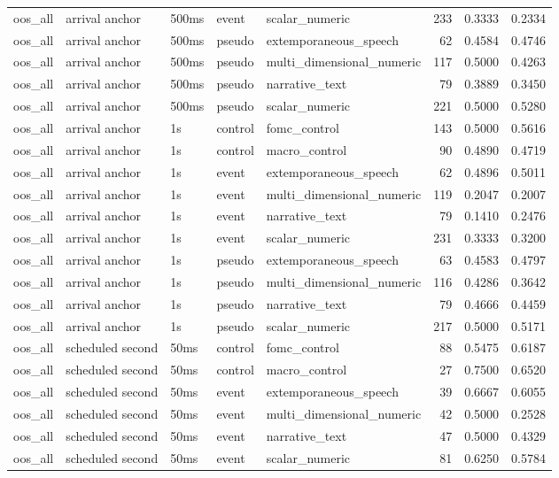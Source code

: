 \begin{tabular}{lllllrrr}
oos_all & arrival anchor & 500ms & event & scalar_numeric & 233 & 0.3333 & 0.2334 \\
oos_all & arrival anchor & 500ms & pseudo & extemporaneous_speech & 62 & 0.4584 & 0.4746 \\
oos_all & arrival anchor & 500ms & pseudo & multi_dimensional_numeric & 117 & 0.5000 & 0.4263 \\
oos_all & arrival anchor & 500ms & pseudo & narrative_text & 79 & 0.3889 & 0.3450 \\
oos_all & arrival anchor & 500ms & pseudo & scalar_numeric & 221 & 0.5000 & 0.5280 \\
oos_all & arrival anchor & 1s & control & fomc_control & 143 & 0.5000 & 0.5616 \\
oos_all & arrival anchor & 1s & control & macro_control & 90 & 0.4890 & 0.4719 \\
oos_all & arrival anchor & 1s & event & extemporaneous_speech & 62 & 0.4896 & 0.5011 \\
oos_all & arrival anchor & 1s & event & multi_dimensional_numeric & 119 & 0.2047 & 0.2007 \\
oos_all & arrival anchor & 1s & event & narrative_text & 79 & 0.1410 & 0.2476 \\
oos_all & arrival anchor & 1s & event & scalar_numeric & 231 & 0.3333 & 0.3200 \\
oos_all & arrival anchor & 1s & pseudo & extemporaneous_speech & 63 & 0.4583 & 0.4797 \\
oos_all & arrival anchor & 1s & pseudo & multi_dimensional_numeric & 116 & 0.4286 & 0.3642 \\
oos_all & arrival anchor & 1s & pseudo & narrative_text & 79 & 0.4666 & 0.4459 \\
oos_all & arrival anchor & 1s & pseudo & scalar_numeric & 217 & 0.5000 & 0.5171 \\
oos_all & scheduled second & 50ms & control & fomc_control & 88 & 0.5475 & 0.6187 \\
oos_all & scheduled second & 50ms & control & macro_control & 27 & 0.7500 & 0.6520 \\
oos_all & scheduled second & 50ms & event & extemporaneous_speech & 39 & 0.6667 & 0.6055 \\
oos_all & scheduled second & 50ms & event & multi_dimensional_numeric & 42 & 0.5000 & 0.2528 \\
oos_all & scheduled second & 50ms & event & narrative_text & 47 & 0.5000 & 0.4329 \\
oos_all & scheduled second & 50ms & event & scalar_numeric & 81 & 0.6250 & 0.5784 \\

\end{tabular}
